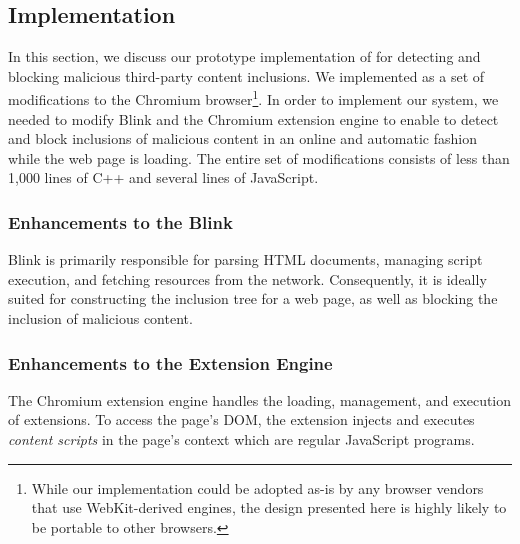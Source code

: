 \subsection{Implementation}
\label{inclusion:sec:implementation}

In this section, we discuss our prototype implementation of \excision for
detecting and blocking malicious third-party content inclusions. We implemented
\excision as a set of modifications to the Chromium browser\footnote{While our
implementation could be adopted as-is by any browser vendors that use
WebKit-derived engines, the design presented here is highly likely to be
portable to other browsers.}. In order to implement our system, we needed to
modify Blink and the Chromium extension engine to enable \excision to detect and
block inclusions of malicious content in an online and automatic fashion while
the web page is loading. The entire set of modifications consists of less than
1,000 lines of C++ and several lines of JavaScript.

\subsubsection{Enhancements to the Blink}

Blink is primarily responsible for parsing HTML documents, managing script
execution, and fetching resources from the network. Consequently, it is ideally
suited for constructing the inclusion tree for a web page, as well as blocking
the inclusion of malicious content.

\subsubsection{Enhancements to the Extension Engine}

The Chromium extension engine handles the loading, management, and execution of
extensions. To access the page's DOM, the extension injects and executes
\emph{content scripts} in the page's context which are regular JavaScript
programs.
